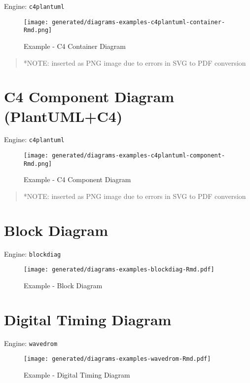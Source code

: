 \documentclass[12pt,a4paper,12pt,oneside,openany]{book}
\begin{document}
Engine: \texttt{c4plantuml}

\begin{figure}
\centering
\texttt{[image: generated/diagrams-examples-c4plantuml-container-Rmd.png]}
\caption{Example - C4 Container Diagram}
\end{figure}

\begin{quote}
*NOTE: inserted as PNG image due to errors in SVG to PDF conversion
\end{quote}

\newpage

\section{C4 Component Diagram (PlantUML+C4)}\label{c4-component-diagram-plantumlc4}

Engine: \texttt{c4plantuml}

\begin{figure}
\centering
\texttt{[image: generated/diagrams-examples-c4plantuml-component-Rmd.png]}
\caption{Example - C4 Component Diagram}
\end{figure}

\begin{quote}
*NOTE: inserted as PNG image due to errors in SVG to PDF conversion
\end{quote}

\newpage

\section{Block Diagram}\label{block-diagram}

Engine: \texttt{blockdiag}

\begin{figure}
\centering
\texttt{[image: generated/diagrams-examples-blockdiag-Rmd.pdf]}
\caption{Example - Block Diagram}
\end{figure}

\newpage

\section{Digital Timing Diagram}\label{digital-timing-diagram}

Engine: \texttt{wavedrom}

\begin{figure}
\centering
\texttt{[image: generated/diagrams-examples-wavedrom-Rmd.pdf]}
\caption{Example - Digital Timing Diagram}
\end{figure}
\end{document}
